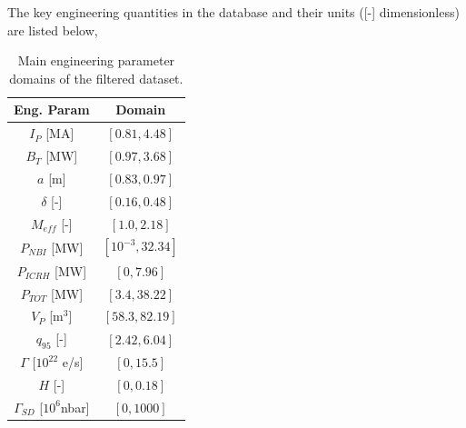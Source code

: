 \documentclass[a4paper, twoside, final, 12pt]{article}
\begin{document}
The key engineering quantities in the database and their units ([-] dimensionless) are listed below,

\begin{table}
\vspace{-10pt}
\centering
\caption{Main engineering parameter domains of the filtered dataset.}
\label{tab:main_domain}
\begin{tabular}{| c | c | }
	\hline
	Eng. Param & Domain \\
	\hline
	$I_P$ [MA] & $[0.81, 4.48]$ \\
	$B_T$ [MW] & $[0.97, 3.68]$ \\
	$a$ [m] & $[0.83, 0.97]$ \\
	$\delta$ [-] & $[0.16, 0.48]$ \\
	$M_{eff}$ [-] & $[1.0, 2.18]$ \\
	$P_{NBI}$ [MW] & $[10^{-3}, 32.34]$ \\
	$P_{ICRH}$ [MW] & $[0, 7.96]$ \\
	$P_{TOT}$ [MW] & $[3.4, 38.22]$ \\
	$V_P$ [m$^3$] &  $[58.3, 82.19]$ \\
	$q_{95}$ [-] & $[2.42, 6.04]$ \\
	$\Gamma$ [$10^{22}$ e/s] & $[0, 15.5]$ \\
	$H$ [-] & $[0, 0.18]$ \\
	$\Gamma_{SD}$ [$10^6$nbar] & $[0,1000]$ \\
	\hline
\end{tabular}
\vspace{-8pt}
\end{table}
\end{document}
